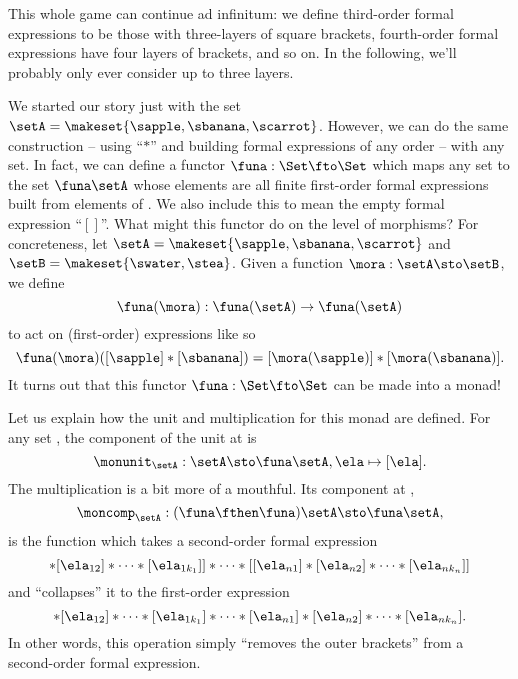 This whole game can continue ad infinitum: we define third-order formal expressions to be those with three-layers of square brackets, fourth-order formal expressions have four layers of brackets, and so on.
In the following, we'll probably only ever consider up to three layers.

We started our story just with the set $\setA = \makeset{ \sapple, \sbanana, \scarrot }$.
However, we can do the same construction -- using ``$*$'' and building formal expressions of any order -- with any set.
In fact, we can define a functor $\funa: \Set \fto \Set$ which maps any set \setA to the set $\funa \setA$ whose elements are all finite first-order formal expressions built from elements of \setA.
We also include this to mean the empty formal expression ``$[ ]$''.
What might this functor do on the level of morphisms?
For concreteness, let $\setA = \makeset{ \sapple, \sbanana, \scarrot } $ and $\setB = \makeset{ \swater, \stea }$.
Given a function $\mora: \setA \sto \setB$, we define
\begin{equation}
    \funa(\mora) : \funa(\setA) \to \funa(\setA)
\end{equation}
to act on (first-order) expressions like so
\begin{equation}
    \funa(\mora)([\sapple]*[\sbanana]) = [\mora(\sapple)]*[\mora(\sbanana)].
\end{equation}
It turns out that this functor $\funa: \Set \fto \Set$ can be made into a monad!

Let us explain how the unit and multiplication for this monad are defined.
For any set \setA, the component of the unit at \setA is
\begin{equation}
    \monunit_\setA : \setA \sto \funa \setA, \ela \mapsto [\ela].
\end{equation}
The multiplication is a bit more of a mouthful.
Its component at \setA,
\begin{equation}
    \moncomp_\setA : (\funa \fthen \funa)\setA \sto \funa \setA,
\end{equation}
is the function which takes a second-order formal expression
\begin{equation}
    [[\ela_{11}]* [\ela_{12}] * \cdots * [\ela_{1k_1}]] * \cdots * [[\ela_{n1}]* [\ela_{n2}] * \cdots * [\ela_{nk_n}]]
\end{equation}
and ``collapses'' it to the first-order expression
\begin{equation}
    [\ela_{11}]
    * [\ela_{12}] * \cdots * [\ela_{1k_1}] * \cdots * [\ela_{n1}]* [\ela_{n2}] * \cdots * [\ela_{nk_n}].
\end{equation}
In other words, this operation simply ``removes the outer brackets'' from a second-order formal expression.

